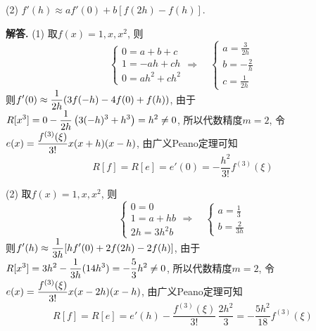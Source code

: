 \documentclass[12pt, a4paper, oneside]{ctexart}
\newenvironment{solution}{\par\noindent\textbf{解答. }}{\bigskip\par}
\begin{document}
(2) $f'(h)\approx af'(0) + b[f(2h)-f(h)].$
\begin{solution}
    (1) 取$f(x) = 1, x, x^2$, 则
    \begin{equation*}
        \begin{cases}
            0 = a+b+c\\
            1=-ah+ch\\
            0=ah^2+ch^2
        \end{cases}\Rightarrow\quad\begin{cases}
            a = \frac{3}{2h}\\
            b = -\frac{2}{h}\\
            c = \frac{1}{2h}
        \end{cases}
    \end{equation*}
    则$\displaystyle f'(0)\approx \frac{1}{2h}(3f(-h)-4f(0)+f(h))$, 由于$\displaystyle R[x^3] = 0 - \frac{1}{2h}\left(3(-h)^3+h^3\right) = h^2 \neq 0$, 所以代数精度$m=2$, 令$\displaystyle e(x) = \frac{f^{(3)}(\xi)}{3!}x(x+h)(x-h)$, 由广义Peano定理可知
    \begin{equation*}
        R[f] = R[e] = e'(0) = -\frac{h^2}{3!}f^{(3)}(\xi)
    \end{equation*}

    (2) 取$f(x) = 1, x, x^2$, 则
    \begin{equation*}
        \begin{cases}
            0 = 0\\
            1 = a + hb\\
            2h = 3h^2 b
        \end{cases}\Rightarrow\quad\begin{cases}
            a = \frac{1}{3}\\
            b = \frac{2}{3h}
        \end{cases}
    \end{equation*}
    则$\displaystyle f'(h)\approx\frac{1}{3h}[hf'(0)+2f(2h)-2f(h)]$, 由于$\displaystyle R[x^3] = 3h^2-\frac{1}{3h}(14h^3) = -\frac{5}{3}h^2\neq 0$, 所以代数精度$m=2$, 令$\displaystyle e(x) = \frac{f^{(3)}(\xi)}{3!}x(x-2h)(x-h)$, 由广义Peano定理可知
    \begin{equation*}
        R[f] = R[e] = e'(h) - \frac{f^{(3)}(\xi)}{3!}\,\frac{2h^2}{3} = -\frac{5h^2}{18}f^{(3)}(\xi)
    \end{equation*}
\end{solution}
\end{document}
